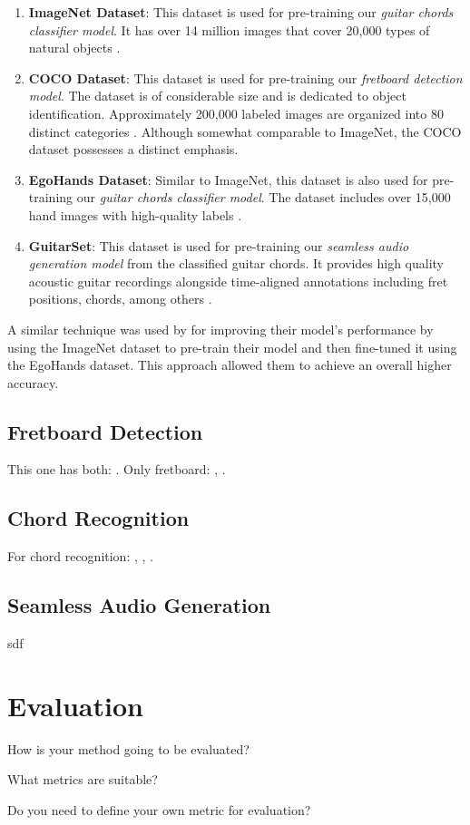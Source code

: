 \documentclass[10pt,twocolumn,letterpaper]{article}
\begin{document}
\begin{enumerate}[label=\arabic*)]
    \item \textbf{ImageNet Dataset}: This dataset is used for pre-training our \emph{guitar chords classifier model}. It has over 14 million images that cover 20,000 types of natural objects \cite{russakovsky2015imagenetlargescalevisual}.
    \item \textbf{COCO Dataset}: This dataset is used for pre-training our \emph{fretboard detection model}. The dataset is of considerable size and is dedicated to object identification. Approximately 200,000 labeled images are organized into 80 distinct categories \cite{lin2015microsoftcococommonobjects}. Although somewhat comparable to ImageNet, the COCO dataset possesses a distinct emphasis.
    \item \textbf{EgoHands Dataset}: Similar to ImageNet, this dataset is also used for pre-training our \emph{guitar chords classifier model}. The dataset includes over 15,000 hand images with high-quality labels \cite{Bambach_2015_ICCV}.
    \item \textbf{GuitarSet}: This dataset is used for pre-training our \emph{seamless audio generation model} from the classified guitar chords. It provides high quality acoustic guitar recordings alongside time-aligned annotations including fret positions, chords, among others \cite{Xi2018}.
\end{enumerate}

A similar technique was used by \cite[2022]{Jadhav_transferlearning} for improving their model's performance by using the ImageNet dataset to pre-train their model and then fine-tuned it using the EgoHands dataset. This approach allowed them to achieve an overall higher accuracy.

\subsection{Fretboard Detection}
This one has both: \cite{guitar-chords-daewp_dataset}. 
Only fretboard: \cite{guitar-ppfil_dataset}, \cite{done-npcll_dataset}.

\subsection{Chord Recognition}
For chord recognition: \cite{guitar-chord-tvon8_dataset}, \cite{guitar-chord-bounding-box_dataset}, \cite{guitar-chord-handshape_dataset}.

\subsection{Seamless Audio Generation}
sdf

\section{Evaluation}

How is your method going to be evaluated?

What metrics are suitable?

Do you need to define your own metric for evaluation?

{\small


}
\end{document}

